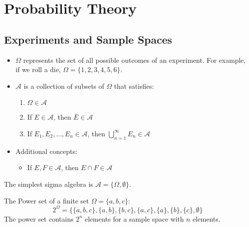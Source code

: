 
\setchapterabstract{}
\chapter{Probability Theory}
\vspace{-1.5cm}

\chaptoc
\vspace{0.5cm}

\section{Experiments and Sample Spaces}

\begin{itemize}
    \item \(\Omega\) represents the set of all possible outcomes of an experiment. For example, if we roll a die, \(\Omega = \{1, 2, 3, 4, 5, 6\}\).
    \item \(\mathcal{A}\) is a collection of subsets of \(\Omega\) that satisfies:
        \begin{enumerate}
            \item \(\Omega \in \mathcal{A}\)
            \item If \(E \in \mathcal{A}\), then \(\bar{E} \in \mathcal{A}\)
            \item If \(E_1, E_2, \dots, E_n \in \mathcal{A}\), then \(\bigcup_{n=1}^\infty E_n \in \mathcal{A}\)
        \end{enumerate}
    \item Additional concepts:
        \begin{itemize}
            \item If \(E, F \in \mathcal{A}\), then \(E \cap F \in \mathcal{A}\)
        \end{itemize}
\end{itemize}

The simplest sigma algebra is \(\mathcal{A} = \{\Omega, \emptyset\}\).

\noindent The Power set of a finite set \(\Omega = \{a, b, c\}\):
\[
2^\Omega = \{\{a, b, c\}, \{a, b\}, \{b, c\}, \{a, c\}, \{a\}, \{b\}, \{c\}, \emptyset\}
\]
The power set contains \(2^{n}\) elements for a sample space with \(n\) elements.

